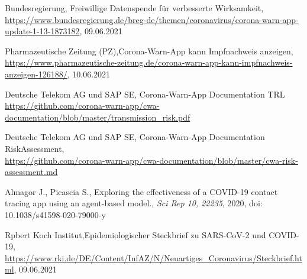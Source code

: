 \documentclass[conference,compsoc]{IEEEtran}
\begin{document}
\begin{thebibliography}{00}
 Bundesregierung, \glqq Freiwillige Datenspende für verbesserte Wirksamkeit\grqq, \\\url{https://www.bundesregierung.de/breg-de/themen/coronavirus/corona-warn-app-update-1-13-1873182}, 09.06.2021

 Pharmazeutische Zeitung (PZ),\glqq Corona-Warn-App kann Impfnachweis anzeigen\grqq,
\url{https://www.pharmazeutische-zeitung.de/corona-warn-app-kann-impfnachweis-anzeigen-126188/}, 10.06.2021

 Deutsche Telekom AG und SAP SE, \glqq Corona-Warn-App Documentation TRL\grqq \\\url{https://github.com/corona-warn-app/cwa-documentation/blob/master/transmission_risk.pdf}

 Deutsche Telekom AG und SAP SE, \glqq Corona-Warn-App Documentation RiskAssessment\grqq, \\\url{https://github.com/corona-warn-app/cwa-documentation/blob/master/cwa-risk-assessment.md}

 Almagor J., Picascia S., \glqq Exploring the effectiveness of a COVID-19 contact tracing app using an agent-based model.\grqq, \textit{Sci Rep 10, 22235}, 2020, doi: 10.1038/s41598-020-79000-y

 Rpbert Koch Institut,\glqq Epidemiologischer Steckbrief zu SARS-CoV-2 und COVID-19\grqq, \\\url{https://www.rki.de/DE/Content/InfAZ/N/Neuartiges\_Coronavirus/Steckbrief.html}, 09.06.2021

\end{thebibliography}
\vspace{12pt}
\end{document}
